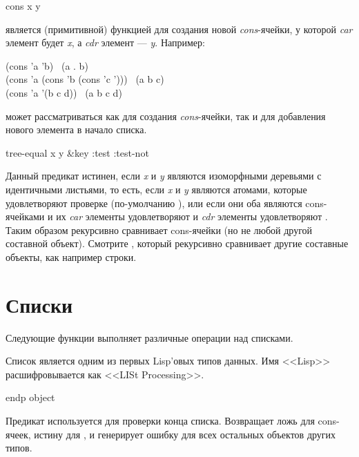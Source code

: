 \begin{defun}[Функция]
cons x y

 является (примитивной) функцией для создания новой
\emph{cons}-ячейки, у которой \emph{car} элемент будет \emph{x}, а \emph{cdr}
элемент --- \emph{y}.
Например:
\begin{lisp}
(cons 'a 'b) \EV\ (a . b) \\
(cons 'a (cons 'b (cons 'c '{\emptylist}))) \EV\ (a b c) \\
(cons 'a '(b c d)) \EV\ (a b c d)
\end{lisp}
 может рассматриваться как для создания \emph{cons}-ячейки, так и для
добавления нового элемента в начало списка.
\end{defun}

\begin{defun}[Функция]
tree-equal x y &key :test :test-not

Данный предикат истинен, если \emph{x} и \emph{y} являются изоморфными деревьями
с идентичными листьями, то есть, если \emph{x} и \emph{y} являются атомами,
которые удовлетворяют проверке (по-умолчанию ),
или если они оба являются cons-ячейками и их \emph{car} элементы удовлетворяют
 и \emph{cdr} элементы удовлетворяют .
Таким образом  рекурсивно сравнивает cons-ячейки (но не любой
другой составной объект). Смотрите , который рекурсивно сравнивает
другие составные объекты, как например строки.
\end{defun}

\section{Списки}

Следующие функции выполняет различные операции над списками.

Список является одним из первых Lisp'овых типов данных. Имя <<Lisp>>
расшифровывается
как <<LISt Processing>>.

\begin{defun}[Функция]
endp object

Предикат  используется для проверки конца списка. Возвращает ложь для
cons-ячеек, истину для {\nil}, и генерирует ошибку для всех остальных объектов
других типов.
\end{defun}

